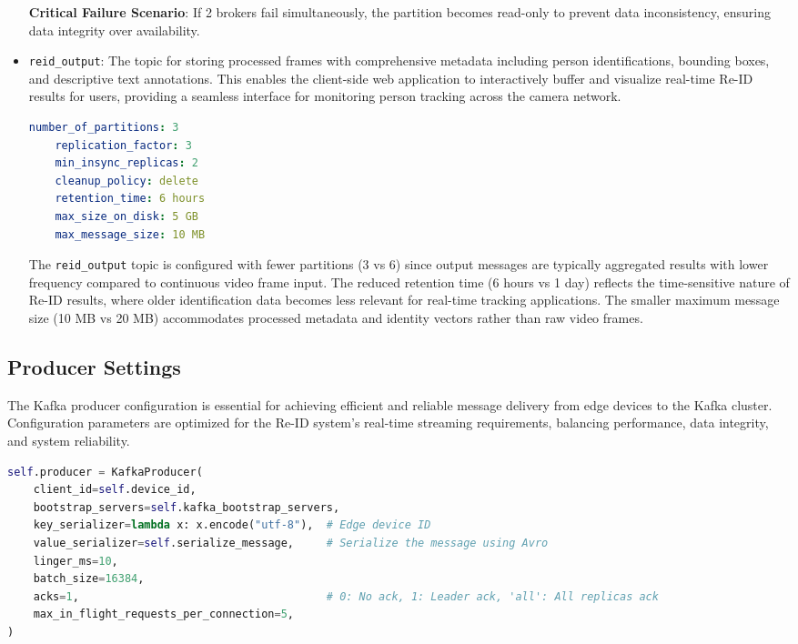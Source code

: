 \begin{itemize}
    \textbf{Critical Failure Scenario}: If 2 brokers fail simultaneously, the partition becomes read-only to prevent data inconsistency, ensuring data integrity over availability.
    
    \item \texttt{reid\_output}: The topic for storing processed frames with comprehensive metadata including person identifications, bounding boxes, and descriptive text annotations. This enables the client-side web application to interactively buffer and visualize real-time Re-ID results for users, providing a seamless interface for monitoring person tracking across the camera network.
    
    \begin{lstlisting}[language=yaml, caption={Topic settings for \texttt{reid\_output}}]
    number_of_partitions: 3
    replication_factor: 3
    min_insync_replicas: 2
    cleanup_policy: delete
    retention_time: 6 hours
    max_size_on_disk: 5 GB
    max_message_size: 10 MB
    \end{lstlisting}
    
    The \texttt{reid\_output} topic is configured with fewer partitions (3 vs 6) since output messages are typically aggregated results with lower frequency compared to continuous video frame input. The reduced retention time (6 hours vs 1 day) reflects the time-sensitive nature of Re-ID results, where older identification data becomes less relevant for real-time tracking applications. The smaller maximum message size (10 MB vs 20 MB) accommodates processed metadata and identity vectors rather than raw video frames.
\end{itemize}

\subsection{Producer Settings}

The Kafka producer configuration is essential for achieving efficient and reliable message delivery from edge devices to the Kafka cluster. Configuration parameters are optimized for the Re-ID system's real-time streaming requirements, balancing performance, data integrity, and system reliability.\\

\begin{lstlisting}[language=Python, caption={Kafka producer configuration for edge devices}]
self.producer = KafkaProducer(
    client_id=self.device_id,
    bootstrap_servers=self.kafka_bootstrap_servers,
    key_serializer=lambda x: x.encode("utf-8"),  # Edge device ID
    value_serializer=self.serialize_message,     # Serialize the message using Avro
    linger_ms=10,
    batch_size=16384,
    acks=1,                                      # 0: No ack, 1: Leader ack, 'all': All replicas ack
    max_in_flight_requests_per_connection=5,
)
\end{lstlisting}


